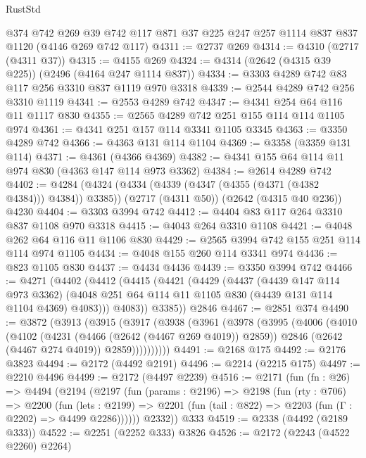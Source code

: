 \begin{lexlean}{RustStd}
\begin{coremodule}
    @374
    @742
    @269
    @39
    @742
    @117
    @871
    @37
    @225
    @247
    @257
    @1114
    @837
    @837
    @1120
    (@4146 @269 @742 @117)
@4311 := @2737 @269
@4314 := @4310 (@2717 (@4311 @37))
@4315 := @4155 @269
@4324 := @4314 (@2642 (@4315 @39 @225)) (@2496 (@4164 @247 @1114 @837))
@4334 := @3303 @4289 @742 @83 @117 @256 @3310 @837 @1119 @970 @3318
@4339 := @2544 @4289 @742 @256 @3310 @1119
@4341 := @2553 @4289 @742
@4347 := @4341 @254 @64 @116 @11 @1117 @830
@4355 := @2565 @4289 @742 @251 @155 @114 @114 @1105 @974
@4361 := @4341 @251 @157 @114 @3341 @1105 @3345
@4363 := @3350 @4289 @742
@4366 := @4363 @131 @114 @1104
@4369 := @3358 (@3359 @131 @114)
@4371 := @4361 (@4366 @4369)
@4382 := @4341 @155 @64 @114 @11 @974 @830 (@4363 @147 @114 @973 @3362)
@4384 := @2614 @4289 @742
@4402 := @4284
    (@4324 (@4334 (@4339 (@4347 (@4355 (@4371 (@4382 @4384))) @4384)) @3385))
    (@2717 (@4311 @50))
    (@2642 (@4315 @40 @236))
    @4230
@4404 := @3303 @3994 @742
@4412 := @4404 @83 @117 @264 @3310 @837 @1108 @970 @3318
@4415 := @4043 @264 @3310 @1108
@4421 := @4048 @262 @64 @116 @11 @1106 @830
@4429 := @2565 @3994 @742 @155 @251 @114 @114 @974 @1105
@4434 := @4048 @155 @260 @114 @3341 @974
@4436 := @823 @1105 @830
@4437 := @4434 @4436
@4439 := @3350 @3994 @742
@4466 := @4271
    (@4402
      (@4412
        (@4415
          (@4421
            (@4429
              (@4437
                (@4439 @147 @114 @973 @3362)
                (@4048 @251 @64 @114 @11 @1105 @830 (@4439 @131 @114 @1104 @4369) @4083)))
            @4083))
        @3385))
    @2846
@4467 := @2851 @374
@4490 := @3872
    (@3913
      (@3915
        (@3917
          (@3938
            (@3961
              (@3978
                (@3995
                  (@4006
                    (@4010
                      (@4102
                        (@4231 (@4466 (@2642 (@4467 @269 @4019)) @2859))
                        @2846
                        (@2642 (@4467 @274 @4019))
                        @2859))))))))))
@4491 := @2168 @175
@4492 := @2176 @3823
@4494 := @2172 (@4492 @2191)
@4496 := @2214 (@2215 @175)
@4497 := @2210 @4496
@4499 := @2172 (@4497 @2239)
@4516 := @2171
    (fun (fn : @26) =>
    @4494
      (@2194
        (@2197
          (fun (params : @2196) =>
          @2198
            (fun (rty : @706) =>
            @2200
              (fun (lets : @2199) =>
              @2201 (fun (tail : @822) => @2203 (fun (Γ : @2202) => @4499 @2286))))))
        @2332))
    @333
@4519 := @2338 (@4492 (@2189 @333))
@4522 := @2251 (@2252 @333) @3826
@4526 := @2172 (@2243 (@4522 @2260) @2264)

\end{coremodule}
\end{lexlean}
